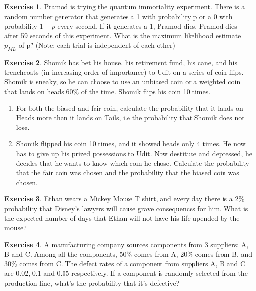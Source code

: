 \documentclass[12pt]{amsart}
\theoremstyle{definition}
\newtheorem{exercise}{Exercise}
\numberwithin{equation}{section}
\theoremstyle{plain}
\begin{document}
\begin{exercise}
    Pramod is trying the quantum immortality experiment. There is a random number generator that generates a 1 with probability p or a 0 with probability $1-p$ every second. If it generates a 1, Pramod dies. Pramod dies after 59 seconds of this experiment. What is the maximum likelihood estimate $p_{ML}$ of p? (Note: each trial is independent of each
other)
\end{exercise}
\begin{exercise}

    Shomik has bet his house, his retirement fund, his cane, and his trenchcoats (in increasing order of importance) to Udit on a series of coin flips. Shomik is sneaky, so he can choose to use an unbiased coin or a weighted coin that lands on heads 60$\%$ of the time. Shomik flips his coin 10 times. 
\begin{enumerate}[label=\Alph*.]

    \item For both the biased and fair coin, calculate the probability that it lands on Heads more than it lands on Tails, i.e the probability that Shomik does not lose. 
    \item Shomik flipped his coin 10 times, and it showed heads only 4 times. He now has to give up his prized possessions to Udit. Now destitute and depressed, he decides that he wants to know which coin he chose. Calculate the probability that the fair coin was chosen and the probability that the biased coin was chosen.
\end{enumerate}    
\end{exercise}


\begin{exercise}
    Ethan wears a Mickey Mouse T shirt, and every day there is a 2\% probability that Disney's lawyers will cause grave consequences for him. What is the expected number of days that Ethan will not have his life upended by the mouse?
\end{exercise}



\begin{exercise}
    A manufacturing company sources components from 3 suppliers: A, B and C. Among all the components, 50\% comes from A, 20\% comes from B, and 30\% comes from C. The defect rates of a component from suppliers A, B and C are 0.02, 0.1 and 0.05 respectively. If a component is randomly selected from the production line, what’s the probability that it’s defective? %
\end{exercise}
    
\end{document}
